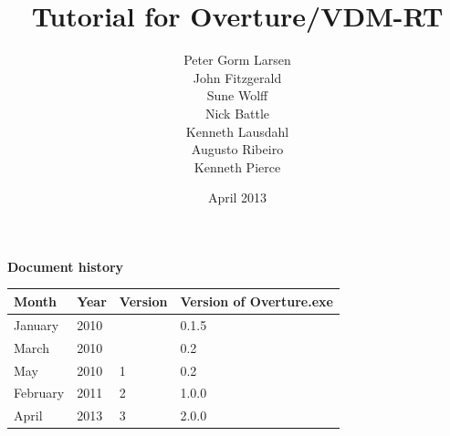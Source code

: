 \documentclass{overturerepsec}
\begin{document}
 
\title{Tutorial for Overture/VDM-RT}
\author{Peter Gorm Larsen\\
        John Fitzgerald \\
        Sune Wolff\\
        Nick Battle\\
        Kenneth Lausdahl\\
        Augusto Ribeiro\\
        Kenneth Pierce}

\date{April 2013}

{}     

\maketitle

{\textbf{Document history}}

\begin{tabular}{|l|l|l|l|}\hline
Month   & Year & Version & Version of Overture.exe \\ \hline
January & 2010 &   & 0.1.5 \\ \hline
March   & 2010     & & 0.2   \\ \hline
May     & 2010 & 1 & 0.2  \\ \hline
February& 2011 & 2 & 1.0.0\\ \hline
April   & 2013 &3  & 2.0.0\\ \hline
\end{tabular}

\tableofcontents
\newpage
% 




\setcounter{page}{1}
\addtocounter{chapter}{2}



\appendix






\end{document}
